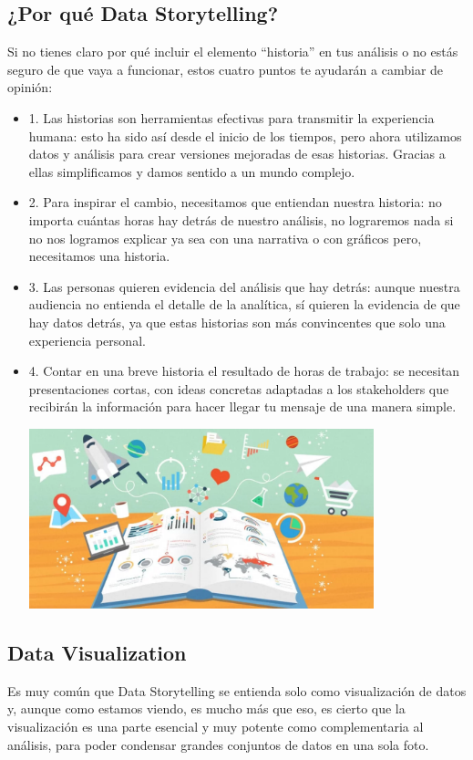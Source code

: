 \documentclass[preprint,12pt]{elsarticle}
\begin{document}
\subsection{¿Por qué Data Storytelling?}
Si no tienes claro por qué incluir el elemento “historia” en tus análisis o no estás seguro de que vaya a funcionar, estos cuatro puntos te ayudarán a cambiar de opinión:

\begin{itemize}
\item	1.	Las historias son herramientas efectivas para transmitir la experiencia humana: esto ha sido así desde el inicio de los tiempos, pero ahora utilizamos datos y análisis para crear versiones mejoradas de esas historias. Gracias a ellas simplificamos y damos sentido a un mundo complejo.
\item 2.	Para inspirar el cambio, necesitamos que entiendan nuestra historia: no importa cuántas horas hay detrás de nuestro análisis, no lograremos nada si no nos logramos explicar ya sea con una narrativa o con gráficos pero, necesitamos una historia.
\item 3.	Las personas quieren evidencia del análisis que hay detrás: aunque nuestra audiencia no entienda el detalle de la analítica, sí quieren la evidencia de que hay datos detrás, ya que estas historias son más convincentes que solo una experiencia personal.
\item	4.	Contar en una breve historia el resultado de horas de trabajo: se necesitan presentaciones cortas, con ideas concretas adaptadas a los stakeholders que recibirán la información para hacer llegar tu mensaje de una manera simple. \\
	\begin{center}
	\includegraphics[width=10cm]{./Imagenes/imagen3} 
	\end{center}
\end{itemize} 


\subsection{Data Visualization}
	Es muy común que Data Storytelling se entienda solo como visualización de datos y, aunque como estamos viendo, es mucho más que eso, es cierto que la visualización es una parte esencial y muy potente como complementaria al análisis, para poder condensar grandes conjuntos de datos en una sola foto.
\end{document}
